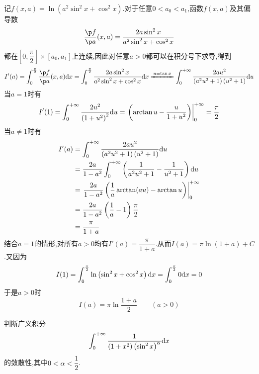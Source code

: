 \documentclass{ctexart}
\begin{document}
\begin{solution}
    记$f(x,a)=\ln\left(a^2\sin^2x+\cos^2x\right)$.对于任意$0<a_0<a_1$,函数$f(x,a)$及其偏导数
    \[\dfrac{\p f}{\p a}(x,a)=\dfrac{2a\sin^2x}{a^2\sin^2x+\cos^2x}\]
    都在$\left[0,\dfrac\pi2\right]\times[a_0,a_1]$上连续,因此对任意$a>0$都可以在积分号下求导,得到
    \[I'(a)
    =\int_0^{\frac\pi2}\dfrac{\p f}{\p a}(x,a)\di x
    =\int_0^{\frac\pi2}\dfrac{2a\sin^2x}{a^2\sin^2x+\cos^2x}\di x
    \xlongequal{u=\tan x}\int_0^{+\infty}\dfrac{2au^2}{\left(a^2u^2+1\right)\left(u^2+1\right)}\di u\]
    当$a=1$时有
    \[I'(1)=\int_0^{+\infty}\dfrac{2u^2}{\left(1+u^2\right)^2}\mathrm{d} u=\left.\left(\arctan u-\dfrac{u}{1+u^2}\right)\right|_0^{+\infty}=\dfrac\pi2\]
    当$a\neq1$时有
    \[\begin{aligned}
        I'(a)
        &= \int_0^{+\infty}\dfrac{2au^2}{\left(a^2u^2+1\right)\left(u^2+1\right)}\mathrm{d} u \\
        &= \dfrac{2a}{1-a^2}\int_0^{+\infty}\left(\dfrac{1}{a^2u^2+1}-\dfrac{1}{u^2+1}\right)\mathrm{d} u \\
        &= \left.\dfrac{2a}{1-a^2}\left(\dfrac1a\arctan(au)-\arctan u\right)\right|_0^{+\infty} \\
        &= \dfrac{2a}{1-a^2}\left(\dfrac1a-1\right)\dfrac\pi2 \\
        &= \dfrac{\pi}{1+a}
    \end{aligned}\]
    结合$a=1$的情形,对所有$a>0$均有$I'(a)=\dfrac{\pi}{1+a}$.从而$I(a)=\pi\ln(1+a)+C$.又因为
    \[I(1)=\int_0^{\frac\pi2}\ln\left(\sin^2x+\cos^2x\right)\mathrm{d} x=\int_0^{\frac\pi2}0\mathrm{d} x=0\]
    于是$a>0$时
    \[I(a)=\pi\ln\dfrac{1+a}{2}\qquad(a>0)\]

\end{solution}
\begin{problem}[5.(12\songti{分})]
    判断广义积分
    \[\int_0^{+\infty}\dfrac{1}{\left(1+x^2\right)\left(\sin^2 x\right)^\alpha}\mathrm{d} x\]
    的敛散性,其中$0<\alpha<\dfrac12$.
\end{problem}
\end{document}
